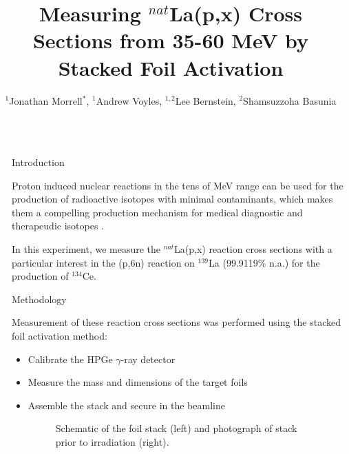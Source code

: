 \documentclass[final]{beamer}
\title{Measuring $^{nat}$La(p,x) Cross Sections from 35-60 MeV by Stacked Foil Activation} %
\author{$^1$Jonathan Morrell$^*$, $^1$Andrew Voyles, $^{1,2}$Lee Bernstein, $^2$Shamsuzzoha Basunia} %
\institute{1: Nuclear Engineering, University of California, Berkeley\\
2: Lawrence Berkeley National Laboratory
} %
\newlength{\sepwid}
\newlength{\onecolwid}
\begin{document}

\begin{frame}[t] %
\begin{columns}[t] %
\begin{column}{\sepwid}\end{column} %
\begin{column}{\onecolwid} %
\begin{block}{Introduction}
\small{\hspace*{50pt}Proton induced nuclear reactions in the tens of MeV range can be used for the production of radioactive isotopes with minimal contaminants, which makes them a compelling production mechanism for medical diagnostic and therapeudic isotopes \cite{TARKANYI2016262, nuclear_data_needs}.

\hspace*{50pt}In this experiment, we measure the $^{nat}$La(p,x) reaction cross sections with a particular interest in the (p,6n) reaction on $^{139}$La (99.9119\% n.a.) \cite{ensdf} for the production of $^{134}$Ce. 
}

\end{block}

\begin{block}{Methodology}


\small{\hspace*{50pt}Measurement of these reaction cross sections was performed using the stacked foil activation method:

\begin{itemize}
\item Calibrate the HPGe $\gamma$-ray detector
\item Measure the mass and dimensions of the target foils
\item Assemble the stack and secure in the beamline

\begin{figure}
\caption{\hspace*{15pt}Schematic of the foil stack (left) and photograph of stack prior to irradiation (right).}
\end{figure}


\end{itemize}}
\end{block}
\end{column}
\end{columns}
\end{frame}
\end{document}
